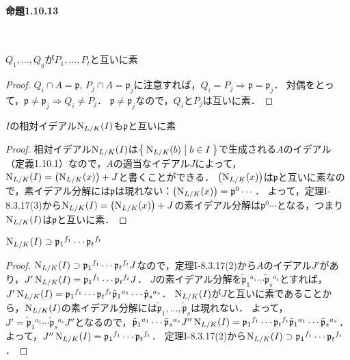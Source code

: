 \paragraph{命題1.10.13}~
\begin{screen}
  $Q_1,\ldots,Q_g$が$P_1,\ldots,P_t$と互いに素
\end{screen}
\begin{proof}
  $Q_i\cap A=\mathfrak{p}$, $P_j\cap A=\mathfrak{p}_j$に注意すれば，$Q_i=P_j \Rightarrow \mathfrak{p}=\mathfrak{p}_j$．
  対偶をとって，$\mathfrak{p}\neq\mathfrak{p}_j \Rightarrow Q_i\neq P_j$．
  $\mathfrak{p}\neq\mathfrak{p}_j$なので，$Q_i$と$P_j$は互いに素．
\end{proof}

\begin{screen}
  $I$の相対イデアル$\operatorname{N}_{L/K}(I)$も$\mathfrak{p}$と互いに素
\end{screen}
\begin{proof}
  相対イデアル$\operatorname{N}_{L/K}(I)$は$\Set{\operatorname{N}_{L/K}(b) | b\in I}$で生成される$A$のイデアル（定義1.10.1）なので，$A$の適当なイデアル$J$によって，$\operatorname{N}_{L/K}(I)=\left(\operatorname{N}_{L/K}(x)\right)+J$と書くことができる．
  $\left(\operatorname{N}_{L/K}(x)\right)$は$\mathfrak{p}$と互いに素なので，素イデアル分解には$\mathfrak{p}$は現れない：$\left(\operatorname{N}_{L/K}(x)\right)=\mathfrak{p}^0\cdots$．
  よって，定理I-8.3.17(3)から$\operatorname{N}_{L/K}(I)=\left(\operatorname{N}_{L/K}(x)\right)+J$の素イデアル分解は$\mathfrak{p}^0\cdots$となる，つまり$\operatorname{N}_{L/K}(I)$は$\mathfrak{p}$と互いに素．
\end{proof}

\begin{screen}
  $\operatorname{N}_{L/K}(I)\supset\mathfrak{p}_1{}^{f_1}\cdots\mathfrak{p}_t{}^{f_t}$
\end{screen}
\begin{proof}
  $\operatorname{N}_{L/K}(I)\supset\mathfrak{p}_1{}^{f_1}\cdots\mathfrak{p}_t{}^{f_t}J$なので，定理I-8.3.17(2)から$A$のイデアル$J'$があり，$J'\operatorname{N}_{L/K}(I)=\mathfrak{p}_1{}^{f_1}\cdots\mathfrak{p}_t{}^{f_t}J$．
  $J$の素イデアル分解を$\tilde{\mathfrak{p}}_1{}^{a_1}\cdots\tilde{\mathfrak{p}}_s{}^{a_s}$とすれば，$J'\operatorname{N}_{L/K}(I)=\mathfrak{p}_1{}^{f_1}\cdots\mathfrak{p}_t{}^{f_t}\tilde{\mathfrak{p}}_1{}^{a_1}\cdots\tilde{\mathfrak{p}}_s{}^{a_s}$．
  $\operatorname{N}_{L/K}(I)$が$J$と互いに素であることから，$\operatorname{N}_{L/K}(I)$の素イデアル分解には$\tilde{\mathfrak{p}}_1,\ldots,\tilde{\mathfrak{p}}_s$は現れない．
  よって，$J'=\tilde{\mathfrak{p}}_1{}^{a_1}\cdots\tilde{\mathfrak{p}}_s{}^{a_s}J''$となるので，$\tilde{\mathfrak{p}}_1{}^{a_1}\cdots\tilde{\mathfrak{p}}_s{}^{a_s}J''\operatorname{N}_{L/K}(I)=\mathfrak{p}_1{}^{f_1}\cdots\mathfrak{p}_t{}^{f_t}\tilde{\mathfrak{p}}_1{}^{a_1}\cdots\tilde{\mathfrak{p}}_s{}^{a_s}$．
  よって，$J''\operatorname{N}_{L/K}(I)=\mathfrak{p}_1{}^{f_1}\cdots\mathfrak{p}_t{}^{f_t}$．
  定理I-8.3.17(2)から$\operatorname{N}_{L/K}(I)\supset\mathfrak{p}_1{}^{f_1}\cdots\mathfrak{p}_t{}^{f_t}$．
\end{proof}

